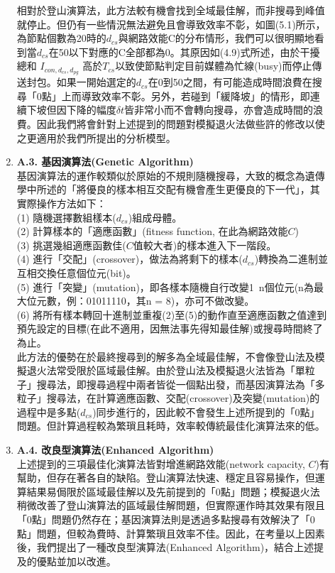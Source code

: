 \documentclass[12pt,a4paper]{article}
\begin{document}
\begin{description}
\begin{enumerate}
相對於登山演算法，此方法較有機會找到全域最佳解，而非搜尋到峰值就停止。但仍有一些情況無法避免且會導致效率不彰，如圖(5.1)所示，為節點個數為20時的$d_{cs}$與網路效能C的分布情形，我們可以很明顯地看到當$d_{cs}$在50以下對應的C全部都為0。其原因如(4.9)式所述，由於干擾總和 $I_{con,d_{cs},d_{pg}}$ 高於$T_{cs}$以致使節點判定目前媒體為忙線(busy)而停止傳送封包。如果一開始選定的$d_{cs}$在0到50之間，有可能造成時間浪費在搜尋「0點」上而導致效率不彰。另外，若碰到「緩降坡」的情形，即連續下坡但因下降的幅度$\delta t$皆非常小而不會轉向搜尋，亦會造成時間的浪費。因此我們將會針對上述提到的問題對模擬退火法做些許的修改以使之更適用於我們所提出的分析模型。\\


\item [\bf ]{\textbf{\Kai A.3. 基因演算法(Genetic Algorithm)  }}\\

基因演算法的運作較類似於原始的不規則隨機搜尋，大致的概念為遺傳學中所述的「將優良的樣本相互交配有機會產生更優良的下一代」，其實際操作方法如下：\\
(1) 隨機選擇數組樣本($d_{cs}$)組成母體。\\
(2) 計算樣本的「適應函數」(fitness function, 在此為網路效能$C$)\\
(3) 挑選幾組適應函數佳($C$值較大者)的樣本進入下一階段。\\
(4) 進行「交配」(crossover)，做法為將剩下的樣本($d_{cs}$)轉換為二進制並互相交換任意個位元(bit)。\\
(5) 進行「突變」(mutation)，即各樣本隨機自行改變1~n個位元(n為最大位元數，例：01011110，其n = 8)，亦可不做改變。\\
(6) 將所有樣本轉回十進制並重複(2)至(5)的動作直至適應函數之值達到預先設定的目標(在此不適用，因無法事先得知最佳解)或搜尋時間終了為止。\\

此方法的優勢在於最終搜尋到的解多為全域最佳解，不會像登山法及模擬退火法常受限於區域最佳解。由於登山法及模擬退火法皆為「單粒子」搜尋法，即搜尋過程中兩者皆從一個點出發，而基因演算法為「多粒子」搜尋法，在計算適應函數、交配(crossover)及突變(mutation)的過程中是多點($d_{cs}$)同步進行的，因此較不會發生上述所提到的「0點」問題。但計算過程較為繁瑣且耗時，效率較傳統最佳化演算法來的低。\\


\item [\bf ]{\textbf{\Kai A.4. 改良型演算法(Enhanced Algorithm) }}\\

上述提到的三項最佳化演算法皆對增進網路效能(network capacity, $C$)有幫助，但存在著各自的缺陷。登山演算法快速、穩定且容易操作，但運算結果易侷限於區域最佳解以及先前提到的「0點」問題；模擬退火法稍微改善了登山演算法的區域最佳解問題，但實際運作時其效果有限且「0點」問題仍然存在；基因演算法則是透過多點搜尋有效解決了「0點」問題，但較為費時、計算繁瑣且效率不佳。因此，在考量以上因素後，我們提出了一種改良型演算法(Enhanced Algorithm)，結合上述提及的優點並加以改進。


\end{enumerate}
\end{description}
\end{document}
